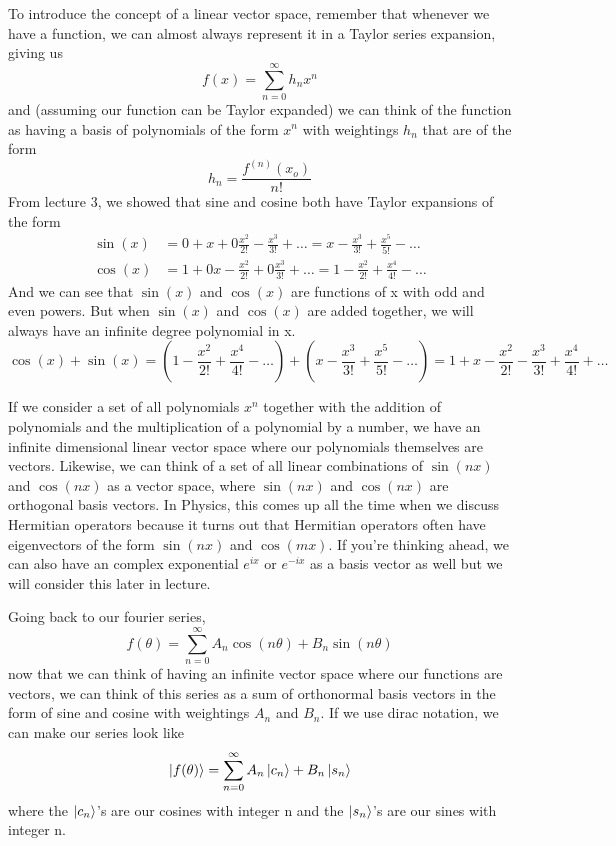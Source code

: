 \documentclass{article}
\newcommand{\be}{\begin{equation}}
\newcommand{\ee}{\end{equation}}
\begin{document}
To introduce the concept of a linear vector space, remember that whenever we have a function, we can almost always represent it in a Taylor series expansion, giving us
\be
  f(x) = \sum_{n=0}^{\infty} h_n x^n
\ee
and (assuming our function can be Taylor expanded) we can think of the function as having a basis of polynomials of the form $x^n$ with weightings $h_n$ that are of the form
\be
  h_n = \frac{f^{(n)}(x_o)}{n!}
\ee
From lecture 3, we showed that sine and cosine both have Taylor expansions of the form
\be
  \begin{split}
    \sin(x) &= 0 + x + 0\frac{x^2}{2!} - \frac{x^3}{3!} + \hdots = x - \frac{x^3}{3!} + \frac{x^5}{5!} - \hdots \\
    \cos(x) &= 1 + 0x - \frac{x^2}{2!} + 0 \frac{x^3}{3!} + \hdots = 1 - \frac{x^2}{2!} + \frac{x^4}{4!} - \hdots
  \end{split}
\ee
And we can see that $\sin(x)$ and $\cos(x)$ are functions of x with odd and even powers.
But when $\sin(x)$ and $\cos(x)$ are added together, we will always have an infinite degree polynomial in x.
\be
  \cos(x) + \sin(x) = (1 - \frac{x^2}{2!} + \frac{x^4}{4!} - \hdots) + (x - \frac{x^3}{3!} + \frac{x^5}{5!} - \hdots) = 1 + x - \frac{x^2}{2!} - \frac{x^3}{3!} + \frac{x^4}{4!} + \hdots
\ee

If we consider a set of all polynomials $x^n$ together with the addition of polynomials and the multiplication of a polynomial by a number, we have an infinite dimensional linear vector space where our polynomials themselves are vectors.
Likewise, we can think of a set of all linear combinations of $\sin(nx)$ and $\cos(nx)$ as a vector space, where $\sin(nx)$ and $\cos(nx)$ are orthogonal basis vectors.
In Physics, this comes up all the time when we discuss Hermitian operators because it turns out that Hermitian operators often have eigenvectors of the form $\sin(nx)$ and $\cos(mx)$.
If you're thinking ahead, we can also have an complex exponential $e^{ix}$ or $e^{-ix}$ as a basis vector as well but we will consider this later in lecture.

Going back to our fourier series,
\be
  f(\theta) = \sum_{n = 0}^{\infty} A_n \cos(n \theta) + B_n \sin(n \theta)
\ee
now that we can think of having an infinite vector space where our functions are vectors, we can think of this series as a sum of orthonormal basis vectors in the form of sine and cosine with weightings $A_n$ and $B_n$.
If we use dirac notation, we can make our series look like
\be
  \ket{f(\theta)} = \sum_{n=0}^{\infty} A_n \ket{c_n} + B_n \ket{s_n}
\ee
where the $\ket{c_n}$'s are our cosines with integer n and the $\ket{s_n}$'s are our sines with integer n.
\end{document}
